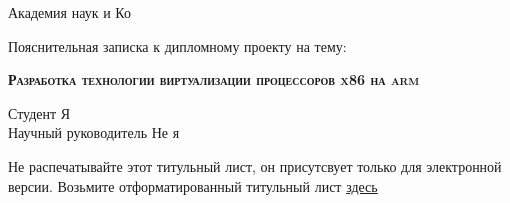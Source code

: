 \begin{titlepage}
\newpage

\begin{center}
Академия наук и Ко \\
\hrulefill
\end{center}

\vspace{9em}
\begin{center}
Пояснительная записка к дипломному проекту на тему:
\end{center}

\vspace{2.5em}
\begin{center}
\textsc{\textbf{Разработка технологии виртуализации процессоров x86 на arm}}
\end{center}

\vspace{6em}

\begin{flushleft}
Студент \hrulefill Я \\
Научный руководитель \hrulefill Не я \\
\end{flushleft}

\vspace{\fill}

\begin{center}
Не распечатывайте этот титульный лист, он присутсвует только для электронной версии. Возьмите отформатированный титульный лист \href{https://mail.google.com/mail/u/0/?ui=2&ik=92d79e1d27&view=att&th=13e7f4d7588d2a66&attid=0.1&disp=safe&realattid=f_hgf57t580&zw}{здесь}
\end{center}

\end{titlepage}
